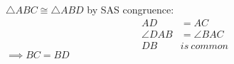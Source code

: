 $\triangle ABC \cong \triangle ABD$ by SAS congruence:
\begin{align*}
AD &= AC \\
\angle{DAB} &= \angle{BAC} \\
DB\ &is\ common
\end{align*}
$\implies BC = BD$